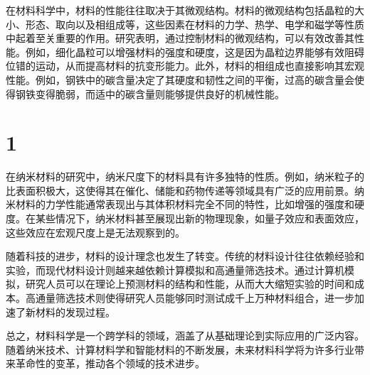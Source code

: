 在材料科学中，材料的性能往往取决于其微观结构。材料的微观结构包括晶粒的大小、形态、取向以及相组成等，这些因素在材料的力学、热学、电学和磁学等性质中起着至关重要的作用。研究表明，通过控制材料的微观结构，可以有效改善其性能。例如，细化晶粒可以增强材料的强度和硬度，这是因为晶粒边界能够有效阻碍位错的运动，从而提高材料的抗变形能力。此外，材料的相组成也直接影响其宏观性能。例如，钢铁中的碳含量决定了其硬度和韧性之间的平衡，过高的碳含量会使得钢铁变得脆弱，而适中的碳含量则能够提供良好的机械性能。\par
\section{1}
在纳米材料的研究中，纳米尺度下的材料具有许多独特的性质。例如，纳米粒子的比表面积极大，这使得其在催化、储能和药物传递等领域具有广泛的应用前景。纳米材料的力学性能通常表现出与其体积材料完全不同的特性，比如增强的强度和硬度。在某些情况下，纳米材料甚至展现出新的物理现象，如量子效应和表面效应，这些效应在宏观尺度上是无法观察到的。\par
随着科技的进步，材料的设计理念也发生了转变。传统的材料设计往往依赖经验和实验，而现代材料设计则越来越依赖计算模拟和高通量筛选技术。通过计算机模拟，研究人员可以在理论上预测材料的结构和性能，从而大大缩短实验的时间和成本。高通量筛选技术则使得研究人员能够同时测试成千上万种材料组合，进一步加速了新材料的发现过程。\par
总之，材料科学是一个跨学科的领域，涵盖了从基础理论到实际应用的广泛内容。随着纳米技术、计算材料学和智能材料的不断发展，未来材料科学将为许多行业带来革命性的变革，推动各个领域的技术进步。\par
